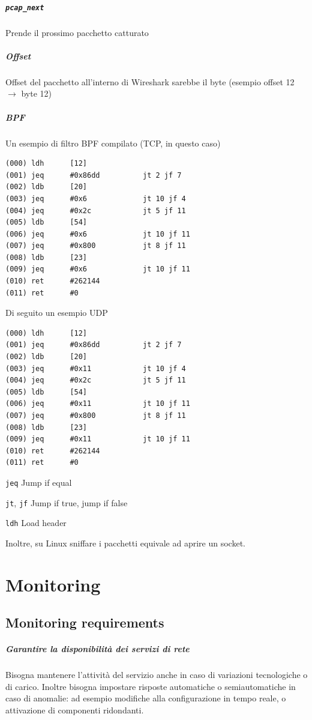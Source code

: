 \documentclass[10pt]{book}
\begin{document}
\paragraph{\texttt{pcap\_next}} Prende il prossimo pacchetto catturato
\paragraph{Offset} Offset del pacchetto all'interno di Wireshark sarebbe il byte (esempio offset 12 $\rightarrow$ byte 12)
\paragraph{BPF} Un esempio di filtro BPF compilato (TCP, in questo caso) \begin{lstlisting}
(000) ldh      [12]
(001) jeq      #0x86dd          jt 2 jf 7
(002) ldb      [20]
(003) jeq      #0x6             jt 10 jf 4
(004) jeq      #0x2c            jt 5 jf 11
(005) ldb      [54]
(006) jeq      #0x6             jt 10 jf 11
(007) jeq      #0x800           jt 8 jf 11
(008) ldb      [23]
(009) jeq      #0x6             jt 10 jf 11
(010) ret      #262144
(011) ret      #0
\end{lstlisting}
Di seguito un esempio UDP \begin{lstlisting}
(000) ldh      [12]
(001) jeq      #0x86dd          jt 2 jf 7
(002) ldb      [20]
(003) jeq      #0x11            jt 10 jf 4
(004) jeq      #0x2c            jt 5 jf 11
(005) ldb      [54]
(006) jeq      #0x11            jt 10 jf 11
(007) jeq      #0x800           jt 8 jf 11
(008) ldb      [23]
(009) jeq      #0x11            jt 10 jf 11
(010) ret      #262144
(011) ret      #0
\end{lstlisting}
\begin{list}{}{}
	\item \texttt{jeq} Jump if equal
	\item \texttt{jt}, \texttt{jf} Jump if true, jump if false
	\item \texttt{ldh} Load header
\end{list}
Inoltre, su Linux sniffare i pacchetti equivale ad aprire un socket.
\chapter{Monitoring}
\section{Monitoring requirements}
\paragraph{Garantire la disponibilità dei servizi di rete} Bisogna mantenere l'attività del servizio anche in caso di variazioni tecnologiche o di carico. Inoltre bisogna impostare risposte automatiche o semiautomatiche in caso di anomalie: ad esempio modifiche alla configurazione in tempo reale, o attivazione di componenti ridondanti.
\end{document}
